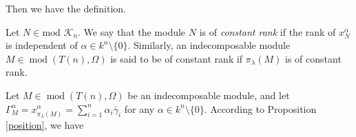 \documentclass[a4paper,12pt]{amsart}
\newcommand{\bg}{\bar{\gamma}}
\DeclareMathOperator{\modd}{mod}
\newenvironment{Definition}[1][Definition.]{\begin{trivlist}
\item[\hskip \labelsep {\bfseries #1}]}{\end{trivlist}}
\begin{document}
Then we have the definition.

\begin{Definition}
Let $N\in \text{mod }\mathcal{K}_n$. We say that the module   $N$ is of \textit{constant rank} if the rank of $x^{\alpha}_N$ is independent of $\alpha\in k^n\setminus \{0\}$. Similarly,  an indecomposable module $M\in \modd(T(n), \Omega)$ is said to be of constant rank if $\pi_\lambda(M)$ is of constant rank.                                                                                                                                                                         
\end{Definition}

Let $M\in \modd(T(n),\Omega)$ be an indecomposable module, and let  $\Gamma^{\alpha}_M=x^{\alpha}_{\pi_\lambda(M)}=\sum^{n}_{i=1}\alpha_i \bg_i$ for any $\alpha\in k^n\setminus\{0\}$. According to Proposition \ref{position}, we have 
\end{document}
